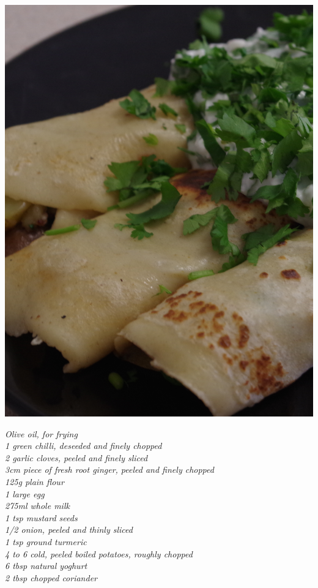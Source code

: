 \documentclass{tufte-book}
\begin{document}
\begin{marginfigure}%
  \includegraphics[width=\linewidth]{masalapancakes.png}
\end{marginfigure}

\smallskip
\emph{Olive oil, for frying
\\1 green chilli, deseeded and finely chopped
\\2 garlic cloves, peeled and finely sliced
\\3cm piece of fresh root ginger, peeled and finely chopped
\\125g plain flour
\\1 large egg
\\275ml whole milk
\\1 tsp mustard seeds
\\1/2 onion, peeled and thinly sliced
\\1 tsp ground turmeric
\\4 to 6 cold, peeled boiled potatoes, roughly chopped
\\6 tbsp natural yoghurt
\\2 tbsp chopped coriander}
\end{document}
